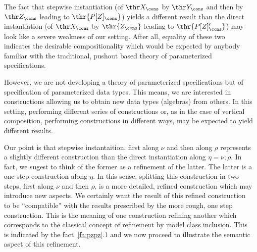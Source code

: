 %
The fact that stepwise instantiation (of $\thr X_\cons$ by $\thr Y_\cons$ and then by
$\thr Z_\cons$ leading to $\thr{P[Z]_\cons}$) yields a different result than the direct instantiation
(of $\thr X_\cons$ by $\thr{Z_\cons}$ leading to $\thr{P[Z]'_\cons}$) may look like a severe weakness of our
setting. After all, equality of these two indicates the desirable
compositionality which would be expected by anybody familiar with the
traditional, pushout based theory of parameterized specifications. 

However,
we are not developing a theory of parameterized specifications but of
specification of parameterized data types. This means, we are interested in
constructions allowing us to obtain new data types (algebras) from others. In
this setting, performing different series of constructions or, as in the case
of vertical composition, performing constructions in different ways, may be
expected to yield different results. 

Our point is that stepwise instantaition, first along $\nu$ and then along
$\rho$ represents a slightly different construction than the direct instantiation
along $\eta=\nu;\rho$. In fact, we sugest to think of the former as a refinement
of the latter. The latter is a one step construction along $\eta$. In this
sense, splitting this construction in two steps, first along $\nu$ and then
$\rho$, is a more detailed, refined construction which may introduce new
aspects. We certainly want the result of this refined construction to be
``compatible'' with the results prescribed by the more rough, one step
construction. This is the meaning of one construction refining another which
corresponds to the classical concept of refinement by model class
inclusion. This is indicated by the fact~\ref{fa:pzpz}.1 and we now
proceed to illustrate the semantic aspect of this refinement.

